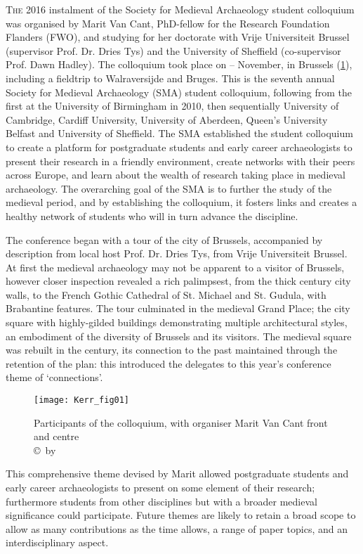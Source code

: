 \documentclass[%
	]{ijsra}
\begin{document}
\IJSRAopening%
\lettrine{T}{he} 2016 instalment of the Society for Medieval Archaeology student colloquium was organised by Marit Van Cant, PhD-fellow for the Research Foundation Flanders (FWO), and studying for her doctorate with Vrije Universiteit Brussel (supervisor Prof. Dr. Dries Tys) and the University of Sheffield (co-supervisor Prof. Dawn Hadley). 
The colloquium took place on – November, in Brussels (\cref{fig:Kerr_fig01}), including a fieldtrip to Walraversijde and Bruges. This is the seventh annual Society for Medieval Archaeology (SMA) student colloquium, following from the first at the University of Birmingham in 2010, then sequentially University of Cambridge, Cardiff University, University of Aberdeen, Queen’s University Belfast and University of Sheffield. The SMA established the student colloquium to create a platform for postgraduate students and early career archaeologists to present their research in a friendly environment, create networks with their peers across Europe, and learn about the wealth of research taking place in medieval archaeology. The overarching goal of the SMA is to further the study of the medieval period, and by establishing the colloquium, it fosters links and creates a healthy network of students who will in turn advance the discipline.

The conference began with a tour of the city of Brussels, accompanied by description from local host Prof. Dr. Dries Tys, from Vrije Universiteit Brussel. At first the medieval archaeology may not be apparent to a visitor of Brussels, however closer inspection revealed a rich palimpsest, from the thick  century city walls, to the French Gothic Cathedral of St. Michael and St. Gudula, with Brabantine features. The tour culminated in the medieval Grand Place; the city square with highly-gilded buildings demonstrating multiple architectural styles, an embodiment of the diversity of Brussels and its visitors. The medieval square was rebuilt in the  century, its connection to the past maintained through the retention of the plan: this introduced the delegates to this year’s conference theme of ‘connections’. 

\begin{figure}[!tb]
\texttt{[image: Kerr\_fig01]}
\caption{Participants of the colloquium, with organiser Marit Van Cant front and centre
        {\normalfont\scriptsize \\ \copyright\ by 
                 \shortauthor
                  }}
\label{fig:Kerr_fig01}
\end{figure}
This comprehensive theme devised by Marit allowed postgraduate students and early career archaeologists to present on some element of their research; furthermore students from other disciplines but with a broader medieval significance could participate. Future themes are likely to retain a broad scope to allow as many contributions as the time allows, a range of paper topics, and an interdisciplinary aspect. 
\end{document}
